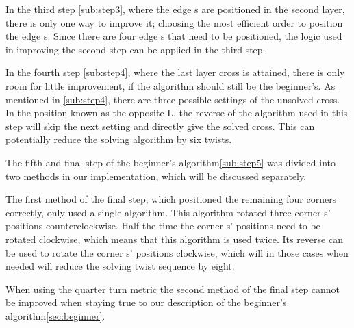 In the third step \ref{sub:step3}, where the edge \cpiece{}s are positioned in the second layer, there is only one way to improve it; choosing the most efficient order to position the edge \cpiece{}s. Since there are four edge \cpiece{}s that need to be positioned, the logic used in improving the second step can be applied in the third step.

In the fourth step \ref{sub:step4}, where the last layer cross is attained, there is only room for little improvement, if the algorithm should still be the beginner's. As mentioned in \ref{sub:step4}, there are three possible settings of the unsolved cross. In the position known as the opposite L, the reverse of the algorithm used in this step will skip the next setting and directly give the solved cross. This can potentially reduce the solving algorithm by six twists.


The fifth and final step of the beginner's algorithm\ref{sub:step5} was divided into two methods in our implementation, which will be discussed separately.


The first method of the final step, which positioned the remaining four corners correctly, only used a single algorithm. This algorithm rotated three corner \cpiece{}s' positions counterclockwise. Half the time the corner \cpiece{}s' positions need to be rotated clockwise, which means that this algorithm is used twice. Its reverse can be used to rotate the corner \cpiece{}s' positions clockwise, which will in those cases when needed will reduce the solving twist sequence by eight.

When using the quarter turn metric the second method of the final step cannot be improved when staying true to our description of the beginner's algorithm\ref{sec:beginner}.